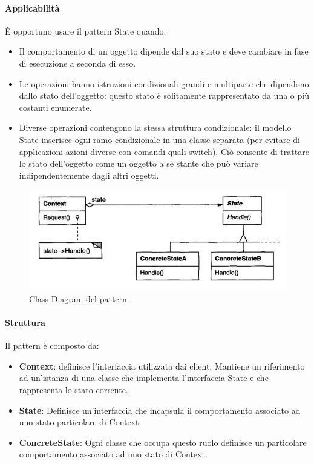 \paragraph{Applicabilità} È opportuno usare il pattern State quando:
\begin{itemize}
    \item Il comportamento di un oggetto dipende dal suo stato e deve cambiare in fase di esecuzione a seconda di esso.
    \item Le operazioni hanno istruzioni condizionali grandi e multiparte che dipendono dallo stato dell'oggetto: questo stato è solitamente rappresentato da una o più costanti enumerate.
    \item Diverse operazioni contengono la stessa struttura condizionale: il modello State inserisce ogni ramo condizionale in una classe separata (per evitare di applicazioni azioni diverse con comandi quali switch). Ciò consente di trattare lo stato dell'oggetto come un oggetto a sé stante che può variare indipendentemente dagli altri oggetti.
\end{itemize}

\begin{figure}[H]
    \centering
    \includegraphics[width=0.75\linewidth]{assets/pattern/state/state-struttura.png}
    \caption{Class Diagram del pattern}
\end{figure}

\paragraph{Struttura} Il pattern è composto da:
\begin{itemize}
    \item \textbf{Context}: definisce l’interfaccia utilizzata dai client. Mantiene un riferimento ad un’istanza di una classe che implementa l’interfaccia State e che rappresenta lo stato corrente.
    \item \textbf{State}: Definisce un’interfaccia che incapsula il comportamento associato ad uno stato particolare di Context.
    \item \textbf{ConcreteState}: Ogni classe che occupa questo ruolo definisce un particolare comportamento associato ad uno stato di Context.
\end{itemize}


